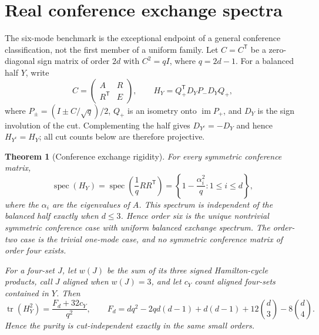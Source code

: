 \documentclass[11pt]{article}
\newtheorem{theorem}{Theorem}[section]
\theoremstyle{remark}
\begin{document}
\section{Real conference exchange spectra}

The six-mode benchmark is the exceptional endpoint of a general conference
classification, not the first member of a uniform family.  Let
\(C=C^{\mathsf T}\) be a zero-diagonal sign matrix of order \(2d\) with
\(C^2=qI\), where \(q=2d-1\).  For a balanced half \(Y\), write
\[
 C=\begin{pmatrix}A&R\\R^{\mathsf T}&E\end{pmatrix},
 \qquad
 H_Y=Q_+^{\mathsf T}D_YP_-D_YQ_+,
\]
where \(P_\pm=(I\pm C/\sqrt q)/2\), \(Q_+\) is an isometry onto
\(\operatorname{im}P_+\), and \(D_Y\) is the sign involution of the cut.
Complementing the half gives \(D_{Y^c}=-D_Y\) and hence
\(H_{Y^c}=H_Y\); all cut counts below are therefore projective.

\begin{theorem}[Conference exchange rigidity]
\label{thm:general-exchange-rigidity}
For every symmetric conference matrix,
\[
 \operatorname{spec}(H_Y)
 =\operatorname{spec}\!\left(\frac1qRR^{\mathsf T}\right)
 =\left\{1-\frac{\alpha_i^2}{q}:1\leq i\leq d\right\},
\]
where the \(\alpha_i\) are the eigenvalues of \(A\).  This spectrum is
independent of the balanced half exactly when \(d\leq3\).  Hence order six is
the unique nontrivial symmetric conference case with uniform balanced
exchange spectrum.  The order-two case is the trivial one-mode case, and no
symmetric conference matrix of order four exists.

For a four-set \(J\), let \(w(J)\) be the sum of its three signed
Hamilton-cycle products, call \(J\) \emph{aligned} when \(w(J)=3\), and let
\(c_Y\) count aligned four-sets contained in \(Y\).  Then
\[
 \operatorname{tr}(H_Y^2)=\frac{F_d+32c_Y}{q^2},\qquad
 F_d=dq^2-2qd(d-1)+d(d-1)+12\binom d3-8\binom d4.
\]
Hence the purity is cut-independent exactly in the same small orders.
\end{theorem}
\end{document}
